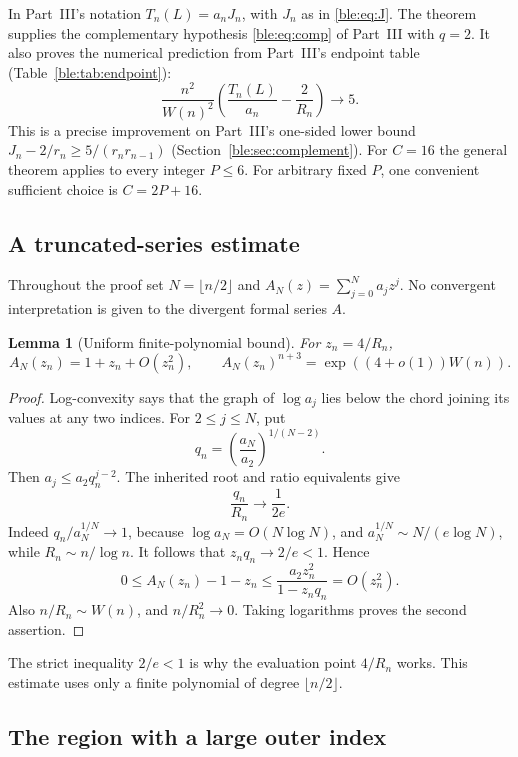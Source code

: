 \documentclass[11pt]{article}
\numberwithin{equation}{section}
\newtheorem{lemma}[theorem]{Lemma}
\theoremstyle{definition}
\theoremstyle{remark}
\begin{document}
In Part~III's notation \(T_n(L)=a_nJ_n\), with \(J_n\) as in
\eqref{ble:eq:J}. The theorem supplies the complementary hypothesis
\eqref{ble:eq:comp} of Part~III with \(q=2\).
It also proves the numerical prediction from Part~III's endpoint table
(Table~\ref{ble:tab:endpoint}):
\[
 \frac{n^2}{W(n)^2}
   \left(\frac{T_n(L)}{a_n}-\frac2{R_n}\right)\longrightarrow5.
\]
This is a precise improvement on Part~III's one-sided lower bound
\(J_n-2/r_n\ge5/(r_nr_{n-1})\) (Section~\ref{ble:sec:complement}).
For \(C=16\) the general theorem applies to every integer \(P\le6\).
For arbitrary fixed \(P\), one convenient sufficient choice is
\(C=2P+16\).

\subsection{A truncated-series estimate}

Throughout the proof set \(N=\lfloor n/2\rfloor\) and
\(A_N(z)=\sum_{j=0}^{N}a_jz^j\).
No convergent interpretation is given to the divergent formal series \(A\).

\begin{lemma}[Uniform finite-polynomial bound]\label{bnc:lem:finitepoly}
For \(z_n=4/R_n\),
\[
 A_N(z_n)=1+z_n+O(z_n^2),\qquad
 A_N(z_n)^{n+3}=\exp((4+o(1))W(n)).
\]
\end{lemma}

\begin{proof}
Log-convexity says that the graph of \(\log a_j\) lies below
the chord joining its values at any two indices.
For \(2\le j\le N\), put
\[
 q_n=\left(\frac{a_N}{a_2}\right)^{1/(N-2)}.
\]
Then \(a_j\le a_2q_n^{j-2}\).
The inherited root and ratio equivalents give
\[
 \frac{q_n}{R_n}\longrightarrow\frac1{2e}.
\]
Indeed \(q_n/a_N^{1/N}\to1\), because
\(\log a_N=O(N\log N)\), and
\(a_N^{1/N}\sim N/(e\log N)\), while
\(R_n\sim n/\log n\).
It follows that \(z_nq_n\to2/e<1\).  Hence
\[
 0\le A_N(z_n)-1-z_n
 \le \frac{a_2z_n^2}{1-z_nq_n}=O(z_n^2).
\]
Also \(n/R_n\sim W(n)\), and \(n/R_n^2\to0\).
Taking logarithms proves the second assertion.
\end{proof}

The strict inequality \(2/e<1\) is why the evaluation point \(4/R_n\)
works.  This estimate uses only a finite polynomial of degree
\(\lfloor n/2\rfloor\).

\subsection{The region with a large outer index}
\end{document}
